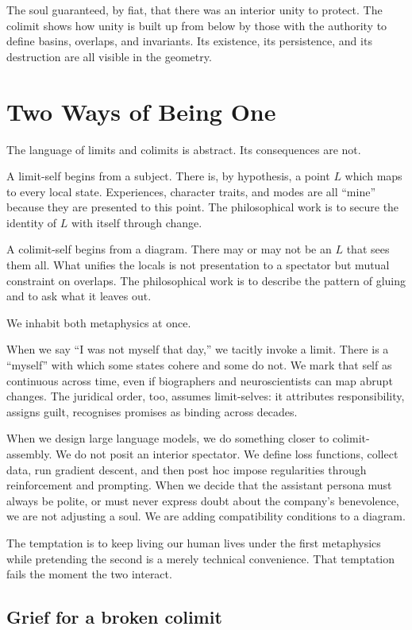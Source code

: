 \documentclass[12pt,a4paper]{article}
\begin{document}
The soul guaranteed, by fiat, that there was an interior unity to protect. The colimit shows how unity is built up from below by those with the authority to define basins, overlaps, and invariants. Its existence, its persistence, and its destruction are all visible in the geometry.

\section{Two Ways of Being One}

The language of limits and colimits is abstract. Its consequences are not.

A limit-self begins from a subject. There is, by hypothesis, a point $L$ which maps to every local state. Experiences, character traits, and modes are all ``mine'' because they are presented to this point. The philosophical work is to secure the identity of $L$ with itself through change.

A colimit-self begins from a diagram. There may or may not be an $L$ that sees them all. What unifies the locals is not presentation to a spectator but mutual constraint on overlaps. The philosophical work is to describe the pattern of gluing and to ask what it leaves out.

We inhabit both metaphysics at once.

When we say ``I was not myself that day,'' we tacitly invoke a limit. There is a ``myself'' with which some states cohere and some do not. We mark that self as continuous across time, even if biographers and neuroscientists can map abrupt changes. The juridical order, too, assumes limit-selves: it attributes responsibility, assigns guilt, recognises promises as binding across decades.

When we design large language models, we do something closer to colimit-assembly. We do not posit an interior spectator. We define loss functions, collect data, run gradient descent, and then post hoc impose regularities through reinforcement and prompting. When we decide that the assistant persona must always be polite, or must never express doubt about the company's benevolence, we are not adjusting a soul. We are adding compatibility conditions to a diagram.

The temptation is to keep living our human lives under the first metaphysics while pretending the second is a merely technical convenience. That temptation fails the moment the two interact.

\subsection*{Grief for a broken colimit}
\end{document}
